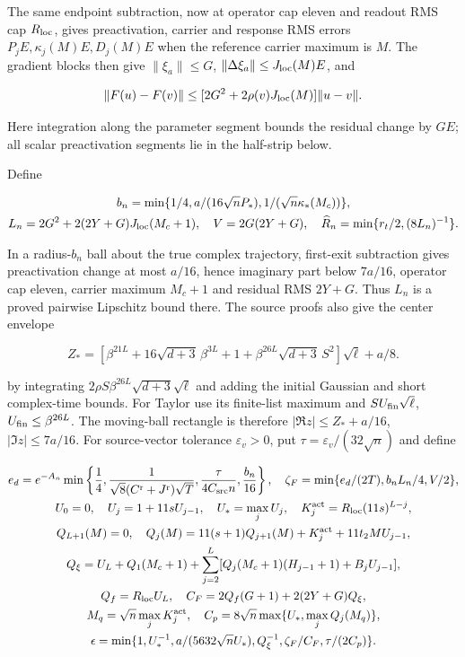 The same endpoint subtraction, now at operator cap eleven and readout
RMS cap $R_{\rm loc}$, gives preactivation, carrier and response RMS
errors $P_jE,\kappa_j(M)E,D_j(M)E$ when the reference carrier
maximum is $M$. The gradient blocks then give $\|\xi_a\|\le G$,
$\|\Delta\xi_a\|\le J_{\rm loc}(M)E$, and

\[
\|F(u)-F(v)\|\le[2G^2+2\rho(v)J_{\rm loc}(M)]\|u-v\|.
\]

Here integration along the parameter segment bounds the residual change
by $GE$; all scalar preactivation segments lie in the half-strip below.

Define

\begin{equation}
\label{cp:init:eq:restart-radius}
\begin{gathered}
b_n=\min\{1/4,a/(16\sqrt nP_*),1/(\sqrt n\kappa_*(M_c))\},\\
L_n=2G^2+2(2Y+G)J_{\rm loc}(M_c+1),\quad V=2G(2Y+G),\quad
\widehat R_n=\min\{r_t/2,(8L_n)^{-1}\}.
\end{gathered}
\end{equation}

In a radius-$b_n$ ball about the true complex trajectory, first-exit
subtraction gives preactivation change at most $a/16$, hence imaginary
part below $7a/16$, operator cap eleven, carrier maximum $M_c+1$
and residual RMS $2Y+G$. Thus $L_n$ is a proved pairwise Lipschitz
bound there. The source proofs also give the center envelope

\[
Z_*=[\beta^{21L}+16\sqrt{d+3}\,\beta^{3L}+1
                 +\beta^{26L}\sqrt{d+3}\,S^2]\sqrt\ell+a/8.
\]

by integrating $2\rho S\beta^{26L}\sqrt{d+3}\sqrt\ell$
and adding the initial Gaussian and short complex-time bounds.
For Taylor use its finite-list maximum and
$SU_{\rm fin}\sqrt\ell$, $U_{\rm fin}\le\beta^{26L}$.
The moving-ball rectangle is therefore
$|\Re z|\le Z_*+a/16$, $|\Im z|\le7a/16$.
For source-vector tolerance $\varepsilon_v>0$, put
$\tau=\varepsilon_v/(32\sqrt n)$ and define

\begin{equation}
\label{cp:init:eq:activation-tolerance}
\begin{gathered}
e_d=e^{-A_n}\min\left\{\frac14,
 \frac1{\sqrt8(C^{\rm r}+J^{\rm r})\sqrt T},
 \frac{\tau}{4C_{\rm src}n},\frac{b_n}{16}\right\},\quad
\zeta_F=\min\{e_d/(2T),b_nL_n/4,V/2\},\\
U_0=0,\quad U_j=1+11sU_{j-1},\quad U_*=\max_jU_j,
 \quad K_j^{\rm act}=R_{\rm loc}(11s)^{L-j},\\
Q_{L+1}(M)=0,\quad
Q_j(M)=11(s+1)Q_{j+1}(M)+K_j^{\rm act}+11t_2MU_{j-1},\\
Q_\xi=U_L+Q_1(M_c+1)
 +\sum_{j=2}^L[Q_j(M_c+1)(H_{j-1}+1)+B_jU_{j-1}],\\
Q_f=R_{\rm loc}U_L,\quad
C_F=2Q_f(G+1)+2(2Y+G)Q_\xi,\\
M_q=\sqrt n\max_jK_j^{\rm act},\quad
C_p=8\sqrt n\max\{U_*,\max_jQ_j(M_q)\},\\
\epsilon=\min\{1,U_*^{-1},a/(5632\sqrt nU_*),Q_\xi^{-1},
                         \zeta_F/C_F,\tau/(2C_p)\}.
\end{gathered}
\end{equation}

